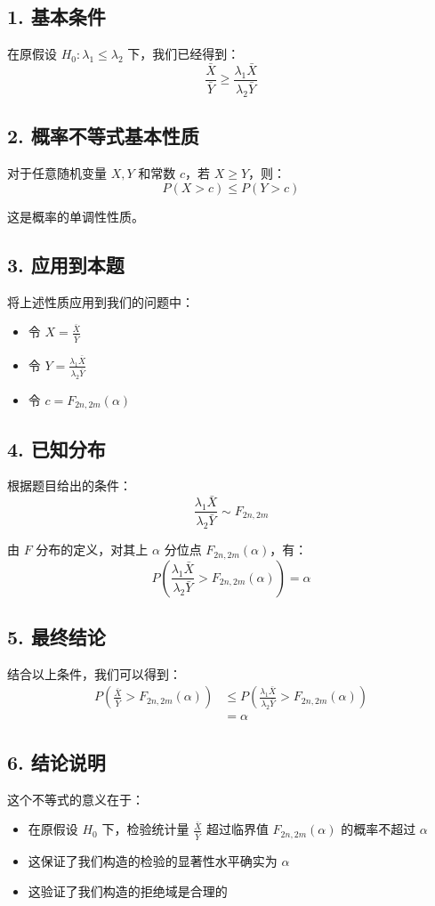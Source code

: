 \documentclass[UTF8]{report}
\theoremstyle{MyLineTheoremStyle} %
\theoremstyle{MyBlockTheoremStyle} %
\theoremstyle{MySubsubsectionStyle} %
\begin{document}
\subsection*{1. 基本条件}
在原假设 $H_0: \lambda_1 \leqslant \lambda_2$ 下，我们已经得到：
\[ \frac{\bar{X}}{\bar{Y}} \geqslant \frac{\lambda_1\bar{X}}{\lambda_2\bar{Y}} \]

\subsection*{2. 概率不等式基本性质}
对于任意随机变量 $X, Y$ 和常数 $c$，若 $X \geqslant Y$，则：
\[ P(X > c) \leqslant P(Y > c) \]

这是概率的单调性性质。

\subsection*{3. 应用到本题}
将上述性质应用到我们的问题中：
\begin{itemize}
    \item 令 $X = \frac{\bar{X}}{\bar{Y}}$
    \item 令 $Y = \frac{\lambda_1\bar{X}}{\lambda_2\bar{Y}}$
    \item 令 $c = F_{2n,2m}(\alpha)$
\end{itemize}

\subsection*{4. 已知分布}
根据题目给出的条件：
\[ \frac{\lambda_1\bar{X}}{\lambda_2\bar{Y}} \sim F_{2n,2m} \]

由 $F$ 分布的定义，对其上 $\alpha$ 分位点 $F_{2n,2m}(\alpha)$，有：
\[ P(\frac{\lambda_1\bar{X}}{\lambda_2\bar{Y}} > F_{2n,2m}(\alpha)) = \alpha \]

\subsection*{5. 最终结论}
结合以上条件，我们可以得到：
\begin{align*}
P(\frac{\bar{X}}{\bar{Y}} > F_{2n,2m}(\alpha)) &\leqslant P(\frac{\lambda_1\bar{X}}{\lambda_2\bar{Y}} > F_{2n,2m}(\alpha)) \\
&= \alpha
\end{align*}

\subsection*{6. 结论说明}
这个不等式的意义在于：
\begin{itemize}
    \item 在原假设 $H_0$ 下，检验统计量 $\frac{\bar{X}}{\bar{Y}}$ 超过临界值 $F_{2n,2m}(\alpha)$ 的概率不超过 $\alpha$
    \item 这保证了我们构造的检验的显著性水平确实为 $\alpha$
    \item 这验证了我们构造的拒绝域是合理的
\end{itemize}
\end{document}
